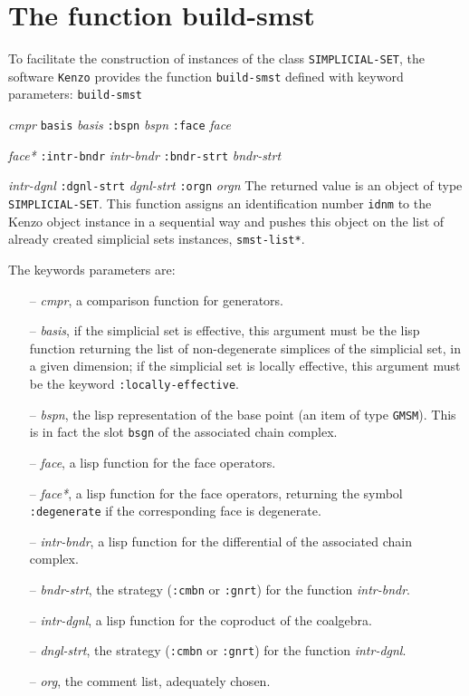\section {The function build-smst}

To facilitate the construction of instances of the 
class {\tt SIMPLICIAL-SET}, the software {\tt Kenzo} provides the function {\tt build-smst}
defined with keyword parameters:
\vskip 0.40cm
{\tt build-smst}\par
\hspace {1cm}{\tt :cmpr} {\em cmpr} {\tt basis} {\em basis} {\tt :bspn} {\em bspn} {\tt :face} {\em face} \par
\hspace {1cm}{\tt :face*} {\em face*} {\tt :intr-bndr} {\em intr-bndr} {\tt :bndr-strt} {\em bndr-strt} \par
\hspace {1cm}{\tt :intr-dgnl} {\em intr-dgnl}  {\tt :dgnl-strt} {\em dgnl-strt }{\tt :orgn} {\em orgn}
\vskip 0.40cm
The returned value is an object of type {\tt SIMPLICIAL-SET}. 
This function assigns an identification number {\tt idnm} to the Kenzo object instance in
a sequential way and pushes this object on the list of already  created simplicial sets instances, {\tt *smst-list*}.
\par
The keywords parameters are:
\begin{itemize}
\item [--] {\em cmpr}, a comparison function for generators. 
\item[--] {\em basis}, if the simplicial set is effective, this argument must be the lisp function 
returning the  list of non-degenerate simplices  of the simplicial set, in a given dimension; 
if the simplicial set is locally effective, this argument must be the keyword {\tt :locally-effective}.
\item[--] {\em bspn}, the lisp representation of the base point (an item of type {\tt GMSM}). This is
in fact the slot {\tt bsgn} of the associated chain complex.
\item[--] {\em face}, a lisp function for the face operators.
\item[--] {\em face*}, a lisp function for the face operators, returning the symbol {\tt :degenerate} if
the corresponding face is degenerate.
\item[--] {\em intr-bndr}, a lisp function for the differential of the associated chain complex.
\item[--] {\em bndr-strt}, the strategy ({\tt :cmbn} or {\tt :gnrt}) for the function {\em intr-bndr}.
\item[--] {\em intr-dgnl}, a lisp function for the coproduct of the coalgebra.
\item[--] {\em dngl-strt}, the strategy ({\tt :cmbn} or {\tt :gnrt}) for the function {\em intr-dgnl}.
\item[--] {\em org}, the comment list, adequately chosen.
\end{itemize}

